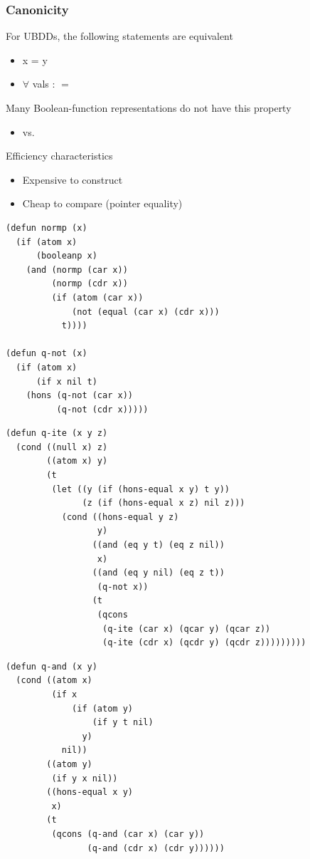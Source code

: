 \begin{frame}
\frametitle{Canonicity}

For UBDDs, the following statements are equivalent
\begin{itemize}
\item x = y
\item $\forall$ vals :  $=$ 
\end{itemize}

\SmallSkip
Many Boolean-function representations do not have this property
\begin{itemize}
\item {} vs. 
\end{itemize}

\SmallSkip

Efficiency characteristics
\begin{itemize}
\item Expensive to construct
\item Cheap to compare (pointer equality)
\end{itemize}

\end{frame}



\begin{frame}[fragile]
\begin{verbatim}
(defun normp (x)
  (if (atom x)
      (booleanp x)
    (and (normp (car x))
         (normp (cdr x))
         (if (atom (car x))
             (not (equal (car x) (cdr x)))
           t))))

(defun q-not (x)
  (if (atom x)
      (if x nil t)
    (hons (q-not (car x))
          (q-not (cdr x)))))
\end{verbatim}
\end{frame}


\begin{frame}[fragile]
\begin{verbatim}
(defun q-ite (x y z)
  (cond ((null x) z)
        ((atom x) y)
        (t 
         (let ((y (if (hons-equal x y) t y))
               (z (if (hons-equal x z) nil z)))
           (cond ((hons-equal y z)
                  y)
                 ((and (eq y t) (eq z nil))
                  x)
                 ((and (eq y nil) (eq z t))
                  (q-not x))
                 (t 
                  (qcons 
                   (q-ite (car x) (qcar y) (qcar z))
                   (q-ite (cdr x) (qcdr y) (qcdr z)))))))))
\end{verbatim}
\end{frame}


\begin{frame}[fragile]
\begin{verbatim}
(defun q-and (x y)
  (cond ((atom x)
         (if x 
             (if (atom y) 
                 (if y t nil) 
               y)
           nil))
        ((atom y)
         (if y x nil))
        ((hons-equal x y)
         x)
        (t
         (qcons (q-and (car x) (car y))
                (q-and (cdr x) (cdr y))))))
\end{verbatim}
\end{frame}

